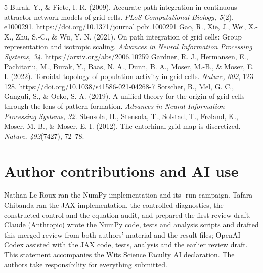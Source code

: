 \documentclass[10pt,letterpaper]{article}
\begin{document}
\begin{thebibliography}{5}
Burak, Y., \& Fiete, I. R. (2009).
Accurate path integration in continuous attractor network models of grid cells.
\emph{PLoS Computational Biology, 5}(2), e1000291.
\url{https://doi.org/10.1371/journal.pcbi.1000291}
Gao, R., Xie, J., Wei, X.-X., Zhu, S.-C., \& Wu, Y. N. (2021).
On path integration of grid cells: Group representation and isotropic scaling.
\emph{Advances in Neural Information Processing Systems, 34}.
\url{https://arxiv.org/abs/2006.10259}
Gardner, R. J., Hermansen, E., Pachitariu, M., Burak, Y., Baas, N. A., Dunn, B. A., Moser, M.-B., \& Moser, E. I. (2022).
Toroidal topology of population activity in grid cells.
\emph{Nature, 602}, 123--128.
\url{https://doi.org/10.1038/s41586-021-04268-7}
Sorscher, B., Mel, G. C., Ganguli, S., \& Ocko, S. A. (2019).
A unified theory for the origin of grid cells through the lens of pattern formation.
\emph{Advances in Neural Information Processing Systems, 32}.
Stensola, H., Stensola, T., Solstad, T., Fr{\o}land, K., Moser, M.-B., \& Moser, E. I. (2012).
The entorhinal grid map is discretized.
\emph{Nature, 492}(7427), 72--78.
\end{thebibliography}

\section{Author contributions and AI use}
Nathan Le Roux ran the NumPy implementation and its \nJobs-run campaign. Tafara Chibanda ran the JAX implementation, the controlled diagnostics, the constructed control and the equation audit, and prepared the first review draft. Claude (Anthropic) wrote the NumPy code, tests and analysis scripts and drafted this merged review from both authors' material and the result files; OpenAI Codex assisted with the JAX code, tests, analysis and the earlier review draft. This statement accompanies the Wits Science Faculty AI declaration. The authors take responsibility for everything submitted.

\clearpage
\onecolumn
\renewcommand{\thetable}{A\arabic{table}}\renewcommand{\thefigure}{A\arabic{figure}}
\setcounter{table}{0}\setcounter{figure}{0}
\end{document}

